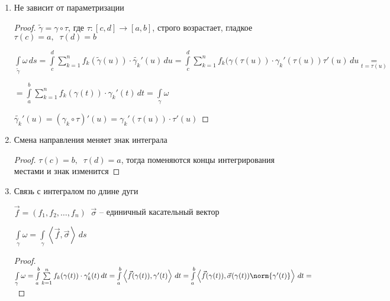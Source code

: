 \begin{properties}\thmslashn
	
	\begin{enumerate}[1.]
		\item 
		Не зависит от параметризации
		
		\begin{proof}\thmslashn
			
			$\tilde{\gamma} = \gamma \circ \tau$, где $\tau: [c, d] \to [a, b]$, строго возрастает, гладкое $\tau(c) = a, \;\;\tau(d) = b$
			
			$\int\limits_{\tilde{\gamma}} \omega \,ds = \int\limits_{c}^{d} 
			\sum\limits_{k=1}^n f_k(\tilde{\gamma}(u)) \cdot \tilde{\gamma_k}'(u)\,du = \int\limits_{c}^{d} 
			\sum\limits_{k=1}^n f_k(\gamma(\tau(u)) \cdot \gamma_k'(\tau(u))\tau'(u)\,du \underset{t = \tau(u)}=$
			
			$= \int\limits_a^b \sum\limits_{k=1}^n f_k(\gamma(t)) \cdot \gamma_k'(t)\,dt = \int\limits_\gamma \omega$
			
			$\tilde{\gamma_k}'(u) = (\gamma_k\circ \tau)'(u) = \gamma_k'(\tau(u))\cdot \tau'(u)$	
			
		\end{proof}
		
		\item
		Смена направления меняет знак интеграла 
		
		\begin{proof}\thmslashn
			
			$\tau(c) = b,\;\; \tau(d) = a$, тогда поменяются концы интегрирования местами и знак изменится
			
		\end{proof}
		
		\item 
		Связь с интегралом по длине дуги
		
		$\vec{f} = (f_1, f_2, \ldots, f_n)\;\; \vec{\sigma}$ -- единичный касательный вектор
		
		$\int\limits_{\gamma} \omega = \int\limits_{\gamma} \left\langle \vec{f}, \vec{\sigma} \right\rangle\,ds $
		
		\begin{proof}\thmslashn
			
			$ \int\limits_{\gamma} \omega = \int\limits_a^b \sum\limits_{k=1}^n f_k(\gamma(t)) \cdot \gamma_k'(t)\,dt = \int\limits_a^b \left\langle \vec{f}(\gamma(t)), \gamma'(t) \right\rangle\,dt = \int\limits_a^b \left\langle \vec{f}(\gamma(t)), \vec{\sigma}(\gamma(t)) \norm{\gamma'(t)} \right\rangle\,dt =$
			

\end{proof}
\end{enumerate}
\end{properties}
